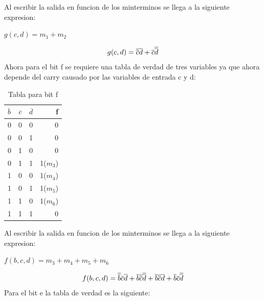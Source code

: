 		\newline Al escribir la salida en funcion de los minterminos se llega a la siguiente expresion:
		\newline \centerline{$g(c,d)=m_{1}+m_{2}$}
		\begin{equation}
			\centerline{$g(c,d)=\overline{\overline{c}}\overline{d}+\overline{c}\overline{\overline{d}}$}
		\end{equation}
		\newline Ahora para el bit f se requiere una tabla de verdad de tres variables ya que ahora depende del carry causado por las variables de entrada c y d:
		\begin{table}[h!]
			\begin{center}
				\caption{Tabla para bit f}
				\begin{tabular}{l|c|c|r}
				\textbf{$\overline{b}$} & \textbf{$\overline{c}$} & \textbf{$\overline{d}$} & \textbf{f}\\
				\hline
				0 & 0 & 0 & 0\\
				0 & 0 & 1 & 0\\	
				0 & 1 & 0 & 0\\
				0 & 1 & 1 & 1($m_{3}$)\\
				1 & 0 & 0 & 1($m_{4}$)\\
				1 & 0 & 1 & 1($m_{5}$)\\	
				1 & 1 & 0 & 1($m_{6}$)\\
				1 & 1 & 1 & 0\\				
				\end{tabular}
			\end{center}
		\end{table}
		\newline Al escribir la salida en funcion de los minterminos se llega a la siguiente expresion:
		\newline \centerline{$f(b,c,d)=m_{3}+m_{4}+m_{5}+m_{6}$}
		\begin{equation}
			\centerline{$f(b,c,d)=\overline{\overline{b}}\overline{c}\overline{d}+\overline{b}\overline{\overline{c}}\overline{\overline{d}}+\overline{b}\overline{\overline{c}}\overline{d}+\overline{b}\overline{c}\overline{\overline{d}}$}
		\end{equation}
		\newline Para el bit e la tabla de verdad es la siguiente:
